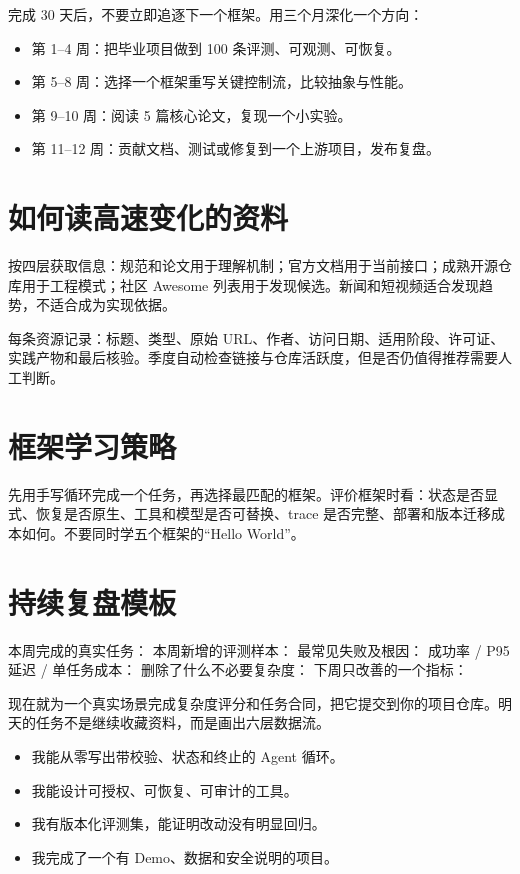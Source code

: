完成 30 天后，不要立即追逐下一个框架。用三个月深化一个方向：

\begin{itemize}
  \item 第 1--4 周：把毕业项目做到 100 条评测、可观测、可恢复。
  \item 第 5--8 周：选择一个框架重写关键控制流，比较抽象与性能。
  \item 第 9--10 周：阅读 5 篇核心论文，复现一个小实验。
  \item 第 11--12 周：贡献文档、测试或修复到一个上游项目，发布复盘。
\end{itemize}

\section{如何读高速变化的资料}

按四层获取信息：规范和论文用于理解机制；官方文档用于当前接口；成熟开源仓库用于工程模式；社区 Awesome 列表用于发现候选。新闻和短视频适合发现趋势，不适合成为实现依据。

每条资源记录：标题、类型、原始 URL、作者、访问日期、适用阶段、许可证、实践产物和最后核验。季度自动检查链接与仓库活跃度，但是否仍值得推荐需要人工判断。

\section{框架学习策略}

先用手写循环完成一个任务，再选择最匹配的框架。评价框架时看：状态是否显式、恢复是否原生、工具和模型是否可替换、trace 是否完整、部署和版本迁移成本如何。不要同时学五个框架的“Hello World”。

\section{持续复盘模板}

\begin{codeblock}
本周完成的真实任务：
本周新增的评测样本：
最常见失败及根因：
成功率 / P95 延迟 / 单任务成本：
删除了什么不必要复杂度：
下周只改善的一个指标：
\end{codeblock}

\begin{practice}[启动第 1 天]
现在就为一个真实场景完成复杂度评分和任务合同，把它提交到你的项目仓库。明天的任务不是继续收藏资料，而是画出六层数据流。
\end{practice}

\begin{checkpoint}[全书毕业检查]
\begin{itemize}
  \item \checkbox 我能从零写出带校验、状态和终止的 Agent 循环。
  \item \checkbox 我能设计可授权、可恢复、可审计的工具。
  \item \checkbox 我有版本化评测集，能证明改动没有明显回归。
  \item \checkbox 我完成了一个有 Demo、数据和安全说明的项目。
\end{itemize}
\end{checkpoint}


